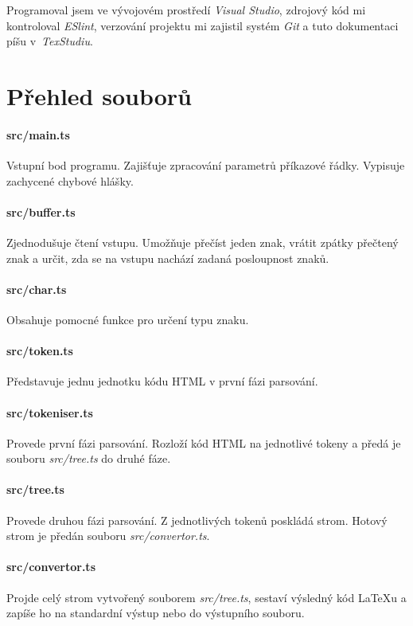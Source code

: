 \documentclass[a4paper,12pt]{article}
\begin{document}
	Programoval jsem ve vývojovém prostředí \textit{Visual Studio}, zdrojový kód mi kontroloval
	\textit{ESlint}, verzování projektu mi zajistil systém \textit{Git} a tuto dokumentaci píšu 
	v~\textit{TexStudiu}.

	\section{Přehled souborů}
	\paragraph{src/main.ts}
	Vstupní bod programu. Zajišťuje zpracování parametrů příkazové řádky. Vypisuje zachycené chybové hlášky.
	
	\paragraph{src/buffer.ts}
	Zjednodušuje čtení vstupu. Umožňuje přečíst jeden znak, vrátit zpátky přečtený znak a určit, zda se na vstupu nachází zadaná posloupnost znaků.
	
	\paragraph{src/char.ts}
	Obsahuje pomocné funkce pro určení typu znaku.
	
	\paragraph{src/token.ts}
	Představuje jednu jednotku kódu HTML v první fázi parsování.
	
	\paragraph{src/tokeniser.ts}
	Provede první fázi parsování. Rozloží kód HTML na jednotlivé tokeny a předá je souboru \emph{src/tree.ts} do druhé fáze.
	
	\paragraph{src/tree.ts}
	Provede druhou fázi parsování. Z jednotlivých tokenů poskládá strom. Hotový strom je předán souboru \emph{src/convertor.ts}.
	
	\paragraph{src/convertor.ts}
	Projde celý strom vytvořený souborem \emph{src/tree.ts}, sestaví výsledný kód LaTeXu a zapíše ho na standardní výstup nebo do výstupního souboru.
	
\end{document}
